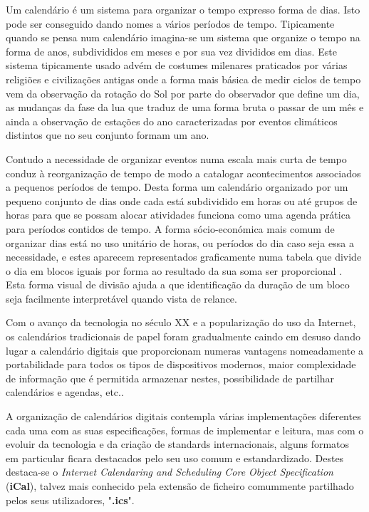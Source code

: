 \documentclass[11pt, twoside]{report}
\begin{document}
	Um calendário é um sistema para organizar o tempo expresso forma de dias.
	Isto pode ser conseguido dando nomes a vários períodos de tempo.
	Tipicamente quando se pensa num calendário imagina-se um sistema que organize o tempo na forma de anos, subdivididos em meses e por sua vez divididos em dias.
	Este sistema tipicamente usado advém de costumes milenares praticados por várias religiões e civilizações antigas onde a forma mais básica de medir ciclos de tempo vem da observação da rotação do Sol por parte do observador que define um dia, as mudanças da fase da lua que traduz de uma forma bruta o passar de um mês e ainda a observação de estações do ano caracterizadas por eventos climáticos distintos que no seu conjunto formam um ano\cite{stray_mayan_2007}.
	
	Contudo a necessidade de organizar eventos numa escala mais curta de tempo conduz à reorganização de tempo de modo a catalogar acontecimentos associados a pequenos períodos de tempo.
	Desta forma um calendário organizado por um pequeno conjunto de dias onde cada está subdividido em horas ou até grupos de horas para que se possam alocar atividades funciona como uma agenda prática para períodos contidos de tempo.
	A forma sócio-económica mais comum de organizar dias está no uso unitário de horas, ou períodos do dia caso seja essa a necessidade, e estes aparecem representados graficamente numa tabela\cite{10.1145/2702613.2732512} que divide o dia em blocos iguais por forma ao resultado da sua soma ser proporcional \cite{Russell1910-RUSPMV}.
	Esta forma visual de divisão ajuda a que identificação da duração de um bloco seja facilmente interpretável quando vista de relance.
	
	Com o avanço da tecnologia no século XX e a popularização do uso da Internet, os calendários tradicionais de papel foram gradualmente caindo em desuso dando lugar a calendário digitais que proporcionam numeras vantagens nomeadamente a portabilidade para todos os tipos de dispositivos modernos, maior complexidade de informação que é permitida armazenar nestes, possibilidade de partilhar calendários e agendas, etc..
	
	A organização de calendários digitais contempla várias implementações diferentes cada uma com as suas especificações, formas de implementar e leitura, mas com o evoluir da tecnologia e da criação de standards internacionais, alguns formatos em particular ficara destacados pelo seu uso comum e estandardizado.
	Destes destaca-se o \textit{Internet Calendaring and Scheduling Core Object Specification} (\textbf{iCal})\cite{rfc2445}, talvez mais conhecido pela extensão de ficheiro comummente partilhado pelos seus utilizadores, "\textbf{.ics}".
	
\end{document}
